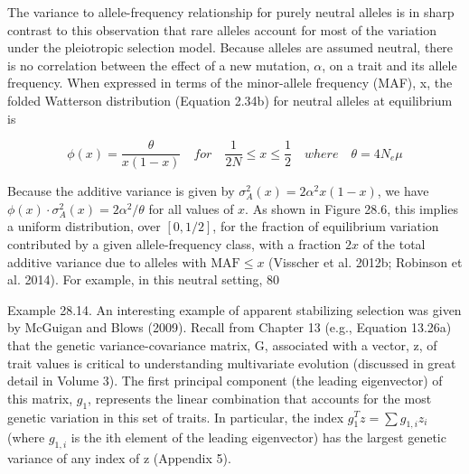 \documentclass{article}
\begin{document}
The variance to allele-frequency relationship for purely neutral alleles is in sharp contrast to this observation that rare alleles account for most of the variation under the pleiotropic selection model. Because alleles are assumed neutral, there is no correlation between the effect of a new mutation,  $ \alpha $, on a trait and its allele frequency. When expressed in terms of the minor-allele frequency (MAF), x, the folded Watterson distribution (Equation 2.34b) for neutral alleles at equilibrium is

\begin{equation}
\phi(x)=\frac{\theta}{x(1-x)}\quad for\quad\frac{1}{2N}\leq x\leq\frac{1}{2}\quad where\quad\theta=4N_{e}\mu
\end{equation}

Because the additive variance is given by  $ \sigma_A^2(x) = 2\alpha^2x(1 - x) $, we have  $ \phi(x) \cdot \sigma_A^2(x) = 2\alpha^2/\theta $ for all values of  $ x $. As shown in Figure 28.6, this implies a uniform distribution, over  $ [0,1/2] $, for the fraction of equilibrium variation contributed by a given allele-frequency class, with a fraction  $ 2x $ of the total additive variance due to alleles with  $ \text{MAF} \leq x $ (Visscher et al. 2012b; Robinson et al. 2014). For example, in this neutral setting, 80%

Example 28.14. An interesting example of apparent stabilizing selection was given by McGuigan and Blows (2009). Recall from Chapter 13 (e.g., Equation 13.26a) that the genetic variance-covariance matrix, G, associated with a vector, z, of trait values is critical to understanding multivariate evolution (discussed in great detail in Volume 3). The first principal component (the leading eigenvector) of this matrix,  $ g_1 $, represents the linear combination that accounts for the most genetic variation in this set of traits. In particular, the index  $ g_1^T z = \sum g_{1,i} z_i $ (where  $ g_{1,i} $ is the ith element of the leading eigenvector) has the largest genetic variance of any index of z (Appendix 5).
\end{document}
